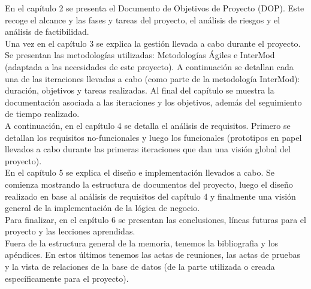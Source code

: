 En el capítulo 2 se presenta el Documento de Objetivos de Proyecto (DOP). Este recoge el alcance y las fases y tareas del proyecto, el análisis de riesgos y el análisis de factibilidad.\\

Una vez en el capítulo 3 se explica la gestión llevada a cabo durante el proyecto. Se presentan las metodologías utilizadas: Metodologías Ágiles e InterMod (adaptada a las necesidades de este proyecto). A continuación se detallan cada una de las iteraciones llevadas a cabo (como parte de la metodología InterMod): duración, objetivos y tareas realizadas. Al final del capítulo se muestra la documentación asociada a las iteraciones y los objetivos, además del seguimiento de tiempo realizado.\\

A continuación, en el capítulo 4 se detalla el análisis de requisitos. Primero se detallan los requisitos no-funcionales y luego los funcionales (prototipos en papel llevados a cabo durante las primeras iteraciones que dan una visión global del proyecto).\\

En el capítulo 5 se explica el diseño e implementación llevados a cabo. Se comienza mostrando la estructura de documentos del proyecto, luego el diseño realizado en base al análisis de requisitos del capítulo 4 y finalmente una visión general de la implementación de la lógica de negocio.\\

Para finalizar, en el capítulo 6 se presentan las conclusiones, líneas futuras para el proyecto y las lecciones aprendidas.\\

Fuera de la estructura general de la memoria, tenemos la bibliografia y los apéndices. En estos últimos tenemos las actas de reuniones, las actas de pruebas y la vista de relaciones de la base de datos (de la parte utilizada o creada específicamente para el proyecto).\\